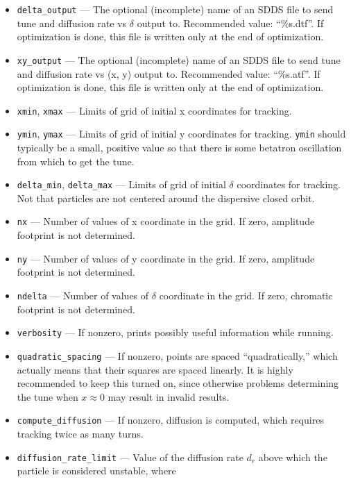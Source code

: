 \documentclass[11pt]{article}
\begin{document}
\begin{itemize}
\item \verb|delta_output| --- The optional (incomplete) name of an SDDS file to send tune and diffusion rate vs $\delta$ output to.  
 Recommended value: ``\%s.dtf''.  If optimization is done, this file is written only at the end of optimization.
\item \verb|xy_output| --- The optional (incomplete) name of an SDDS file to send tune and diffusion rate vs (x, y) output to.  
 Recommended value: ``\%s.atf''.  If optimization is done, this file is written only at the end of optimization.
\item \verb|xmin|, \verb|xmax| --- Limits of grid of initial x coordinates for tracking.             
\item \verb|ymin|, \verb|ymax| --- Limits of grid of initial y coordinates for tracking.             
 \verb|ymin| should typically be a small, positive value so that there                               
 is some betatron oscillation from which to get the tune.                      
\item \verb|delta_min|, \verb|delta_max| --- Limits of grid of initial $\delta$ coordinates
for tracking.  Not that particles are not centered around the dispersive closed orbit.
\item \verb|nx| --- Number of values of x coordinate in the grid. If zero, amplitude footprint is not determined.
\item \verb|ny| --- Number of values of y coordinate in the grid. If zero, amplitude footprint is not determined.
\item \verb|ndelta| --- Number of values of $\delta$ coordinate in the grid. If zero, chromatic footprint is not determined.
\item \verb|verbosity| --- If nonzero, prints possibly useful information while running.
\item \verb|quadratic_spacing| --- If nonzero, points are spaced ``quadratically,'' which actually means that
  their squares are spaced linearly. It is highly recommended to keep this turned on, since otherwise problems determining the
  tune when $x \approx 0$ may result in invalid results.
\item \verb|compute_diffusion| --- If nonzero, diffusion is computed, which requires tracking twice as many turns.
\item \verb|diffusion_rate_limit| --- Value of the diffusion rate $d_r$ above which the particle is considered unstable,
where
\begin{equation}

\end{equation}
\end{itemize}
\end{document}
